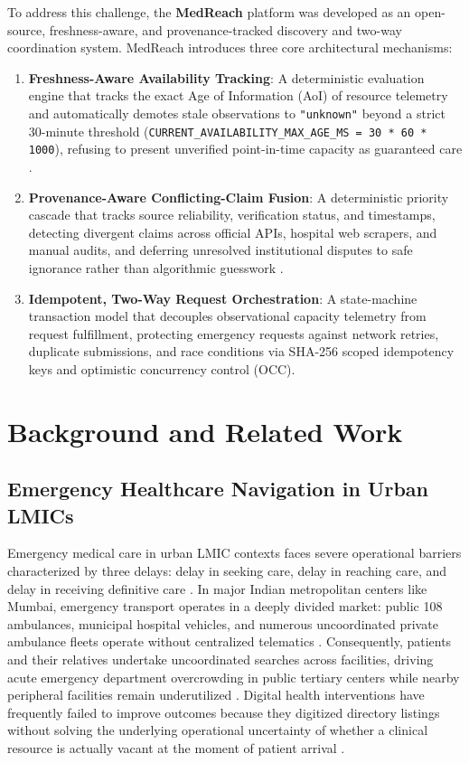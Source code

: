 \documentclass[conference]{IEEEtran}
\begin{document}
To address this challenge, the \textbf{MedReach} platform was developed as an open-source, freshness-aware, and provenance-tracked discovery and two-way coordination system. MedReach introduces three core architectural mechanisms:
\begin{enumerate}
    \item \textbf{Freshness-Aware Availability Tracking}: A deterministic evaluation engine that tracks the exact Age of Information (AoI) of resource telemetry and automatically demotes stale observations to \texttt{"unknown"} beyond a strict 30-minute threshold (\texttt{CURRENT\_AVAILABILITY\_MAX\_AGE\_MS = 30 * 60 * 1000}), refusing to present unverified point-in-time capacity as guaranteed care \cite{kaul2012realtime,yates2021age}.
    \item \textbf{Provenance-Aware Conflicting-Claim Fusion}: A deterministic priority cascade that tracks source reliability, verification status, and timestamps, detecting divergent claims across official APIs, hospital web scrapers, and manual audits, and deferring unresolved institutional disputes to safe ignorance rather than algorithmic guesswork \cite{bleiholder2008data,dong2009data,moreau2011open}.
    \item \textbf{Idempotent, Two-Way Request Orchestration}: A state-machine transaction model that decouples observational capacity telemetry from request fulfillment, protecting emergency requests against network retries, duplicate submissions, and race conditions via SHA-256 scoped idempotency keys and optimistic concurrency control (OCC).
\end{enumerate}

\section{Background and Related Work}

\subsection{Emergency Healthcare Navigation in Urban LMICs}
Emergency medical care in urban LMIC contexts faces severe operational barriers characterized by three delays: delay in seeking care, delay in reaching care, and delay in receiving definitive care \cite{dalton2019patient,skordisworrall2011maternal}. In major Indian metropolitan centers like Mumbai, emergency transport operates in a deeply divided market: public 108 ambulances, municipal hospital vehicles, and numerous uncoordinated private ambulance fleets operate without centralized telematics \cite{naydenova2017healthcare,shinde2026insights}. Consequently, patients and their relatives undertake uncoordinated searches across facilities, driving acute emergency department overcrowding in public tertiary centers while nearby peripheral facilities remain underutilized \cite{darapaneni2021predicting,patil2016study}. Digital health interventions have frequently failed to improve outcomes because they digitized directory listings without solving the underlying operational uncertainty of whether a clinical resource is actually vacant at the moment of patient arrival \cite{metuge2026digital,haeder2024persistence}.
\end{document}
